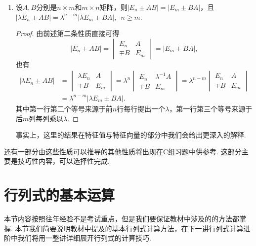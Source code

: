 \begin{enumerate}
\begin{proof}
        本条的其他结论推导类似于上方，在此不再赘述，感兴趣的读者可以自行推导，实际上结论并不是很重要，重要的是在于领悟使用行列式分块计算性质和打洞法的基本方法.
    \end{proof}

    \item 设$A,B$分别是$n \times m$和$m \times n$矩阵，则$|E_n \pm AB|=|E_m \pm BA|$，且 \\
          $|\lambda E_n \pm AB|=\lambda^{n-m}|\lambda E_m \pm BA|,\enspace n \geqslant m$.
    \begin{proof}
        由前述第二条性质直接可得
        \[|E_n \pm AB|=\begin{vmatrix}
            E_n & A \\ \mp B & E_m
        \end{vmatrix}=|E_m \pm BA|,\]
        也有
        \begin{align*}
            |\lambda E_n \pm AB| &=\begin{vmatrix}
                \lambda E_n & A \\ \mp B & E_m
            \end{vmatrix}=\lambda^n\begin{vmatrix}
                E_n & \lambda^{-1}A \\ \mp B & E_m
            \end{vmatrix}=\lambda^{n-m}\begin{vmatrix}
                E_n & A \\ \mp B & E_m
            \end{vmatrix}\\
            &= \lambda^{n-m}|\lambda E_m \pm BA|.
        \end{align*}
        其中第一行第二个等号来源于前$n$行每行提出一个$\lambda$，第一行第三个等号来源于后$m$列每列乘以$\lambda$.
    \end{proof}

    事实上，这里的结果在特征值与特征向量的部分中我们会给出更深入的解释.
\end{enumerate}

还有一部分由这些性质可以推导的其他性质将出现在C组习题中供参考. 这部分主要是技巧性内容，可以选择性完成.

\section{行列式的基本运算}

本节内容按照往年经验不是考试重点，但是我们要保证教材中涉及的的方法都掌握. 本节我们简要说明教材中提及的基本行列式计算方法，在下一讲行列式计算进阶中我们将用一整讲详细展开行列式的计算技巧.

